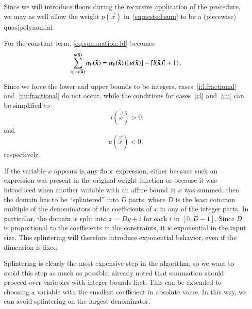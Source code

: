 Since we will introduce floors during the recursive application
of the procedure, we may as well allow the weight
$p(\vec x)$ in~\eqref{eq:nested:sum} to be a (piecewise)
quasipolynomial.

For the constant term, \eqref{eq:summation:1d} becomes
$$
\sum_{x_1 = l(\vec {\hat x})}^{u(\vec{\hat x})} \alpha_0(\vec{\hat x})
    = \alpha_0(\vec{\hat x})
	\left(\floor{u(\vec{\hat x})} - \ceil{l(\vec {\hat x})} + 1\right)
.
$$

Since we force the lower and upper bounds to be integers,
cases~\ref{i:l:fractional} and~\ref{i:u:fractional} do not occur,
while the conditions for cases~\ref{i:l} and~\ref{i:u} can be simplified
to
$$
l(\vec {\hat x}) > 0
$$
and
$$
u(\vec {\hat x}) < 0
,
$$
respectively.

If the variable $x$ appears in any floor expression, either
because such an expression was present in the original weight function
or because it was introduced when another variable with an affine bound
in $x$ was summed, then the domain has to
be ``splintered'' into $D$ parts, where $D$ is the least common
multiple of the denominators of the coefficients of $x$ in
any of the integer parts.
In particular, the domain is split into $x = D y + i$ for
each $i$ in $[0, D-1]$.  Since $D$ is proportional to
the coefficients in the constraints, it is exponential in
the input size.  This splintering will therefore
introduce exponential behavior, even if the dimension is fixed.

Splintering is clearly the most expensive step in the algorithm,
so we want to avoid this step as much as possible.
 already noted that summation should
proceed over variables with integer bounds first.
This can be extended to choosing a variable with the smallest
coefficient in absolute value.  In this way, we can avoid
splintering on the largest denominator.

